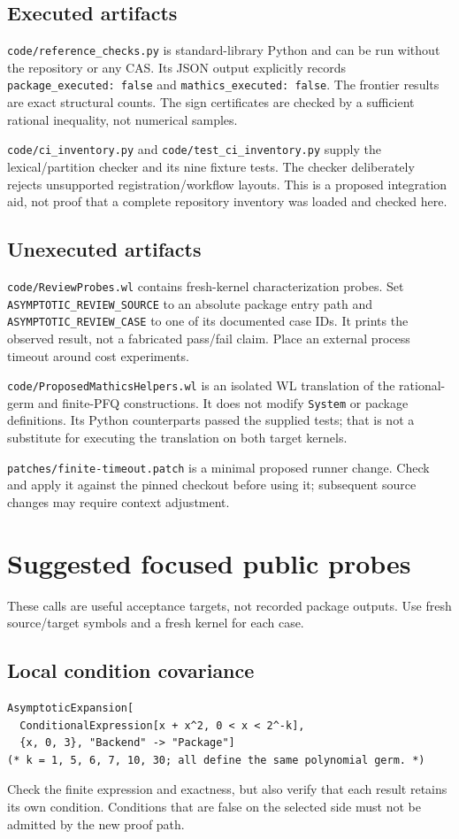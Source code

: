 \documentclass[11pt,letterpaper]{article}
\newcommand{\code}[1]{\nolinkurl{#1}}
\begin{document}
\subsection{Executed artifacts}
\code{code/reference_checks.py} is standard-library Python and can be run
without the repository or any CAS. Its JSON output explicitly records
\code{package_executed: false} and \code{mathics_executed: false}.
The frontier results are exact structural counts. The sign certificates
are checked by a sufficient rational inequality, not numerical samples.

\code{code/ci_inventory.py} and \code{code/test_ci_inventory.py} supply the
lexical/partition checker and its nine fixture tests. The checker deliberately
rejects unsupported registration/workflow layouts. This is a proposed
integration aid, not proof that a complete repository inventory was loaded
and checked here.

\subsection{Unexecuted artifacts}
\code{code/ReviewProbes.wl} contains fresh-kernel characterization probes.
Set \code{ASYMPTOTIC_REVIEW_SOURCE} to an absolute package entry path and
\code{ASYMPTOTIC_REVIEW_CASE} to one of its documented case IDs. It prints
the observed result, not a fabricated pass/fail claim. Place an external
process timeout around cost experiments.

\code{code/ProposedMathicsHelpers.wl} is an isolated WL translation of the
rational-germ and finite-PFQ constructions. It does not modify \code{System}
or package definitions. Its Python counterparts passed the supplied tests;
that is not a substitute for executing the translation on both target kernels.

\code{patches/finite-timeout.patch} is a minimal proposed runner change.
Check and apply it against the pinned checkout before using it; subsequent
source changes may require context adjustment.

\section{Suggested focused public probes}
\label{app:probes}

These calls are useful acceptance targets, not recorded package outputs.
Use fresh source/target symbols and a fresh kernel for each case.

\subsection{Local condition covariance}
\begin{lstlisting}
AsymptoticExpansion[
  ConditionalExpression[x + x^2, 0 < x < 2^-k],
  {x, 0, 3}, "Backend" -> "Package"]
(* k = 1, 5, 6, 7, 10, 30; all define the same polynomial germ. *)
\end{lstlisting}
Check the finite expression and exactness, but also verify that each result
retains its own condition. Conditions that are false on the selected side
must not be admitted by the new proof path.
\end{document}
